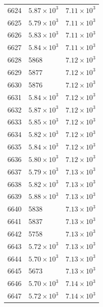 \begin{table}[H]
\begin{tabular}{lll}
6624 & $\displaystyle 5.87 \times 10^{3}$ & $\displaystyle 7.11 \times 10^{3}$ \\
6625 & $\displaystyle 5.79 \times 10^{3}$ & $\displaystyle 7.11 \times 10^{3}$ \\
6626 & $\displaystyle 5.83 \times 10^{3}$ & $\displaystyle 7.11 \times 10^{3}$ \\
6627 & $\displaystyle 5.84 \times 10^{3}$ & $\displaystyle 7.11 \times 10^{3}$ \\
6628 & 5868 & $\displaystyle 7.12 \times 10^{3}$ \\
6629 & 5877 & $\displaystyle 7.12 \times 10^{3}$ \\
6630 & 5876 & $\displaystyle 7.12 \times 10^{3}$ \\
6631 & $\displaystyle 5.84 \times 10^{3}$ & $\displaystyle 7.12 \times 10^{3}$ \\
6632 & $\displaystyle 5.87 \times 10^{3}$ & $\displaystyle 7.12 \times 10^{3}$ \\
6633 & $\displaystyle 5.85 \times 10^{3}$ & $\displaystyle 7.12 \times 10^{3}$ \\
6634 & $\displaystyle 5.82 \times 10^{3}$ & $\displaystyle 7.12 \times 10^{3}$ \\
6635 & $\displaystyle 5.84 \times 10^{3}$ & $\displaystyle 7.12 \times 10^{3}$ \\
6636 & $\displaystyle 5.80 \times 10^{3}$ & $\displaystyle 7.12 \times 10^{3}$ \\
6637 & $\displaystyle 5.79 \times 10^{3}$ & $\displaystyle 7.13 \times 10^{3}$ \\
6638 & $\displaystyle 5.82 \times 10^{3}$ & $\displaystyle 7.13 \times 10^{3}$ \\
6639 & $\displaystyle 5.88 \times 10^{3}$ & $\displaystyle 7.13 \times 10^{3}$ \\
6640 & 5838 & $\displaystyle 7.13 \times 10^{3}$ \\
6641 & 5837 & $\displaystyle 7.13 \times 10^{3}$ \\
6642 & 5758 & $\displaystyle 7.13 \times 10^{3}$ \\
6643 & $\displaystyle 5.72 \times 10^{3}$ & $\displaystyle 7.13 \times 10^{3}$ \\
6644 & $\displaystyle 5.70 \times 10^{3}$ & $\displaystyle 7.13 \times 10^{3}$ \\
6645 & 5673 & $\displaystyle 7.13 \times 10^{3}$ \\
6646 & $\displaystyle 5.70 \times 10^{3}$ & $\displaystyle 7.14 \times 10^{3}$ \\
6647 & $\displaystyle 5.72 \times 10^{3}$ & $\displaystyle 7.14 \times 10^{3}$ \\

\end{tabular}
\end{table}
